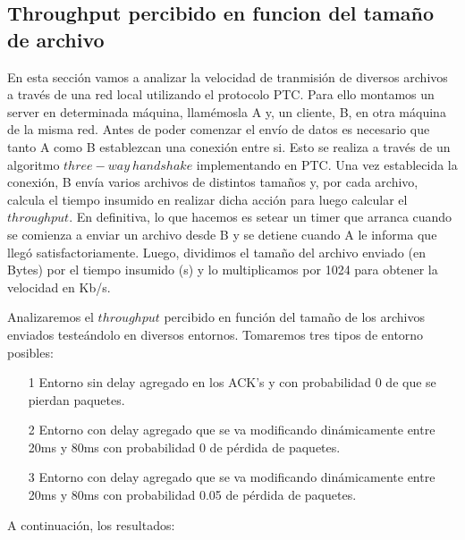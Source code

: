 \subsection{Throughput percibido en funcion del tamaño de archivo}

En esta sección vamos a analizar la velocidad de tranmisión de diversos archivos a través de una red local utilizando el protocolo PTC. Para ello montamos un server en determinada máquina, llamémosla A y, un cliente, B, en otra máquina de la misma red. Antes de poder comenzar el envío de datos es necesario que tanto A como B establezcan una conexión entre si. Esto se realiza a través de un algoritmo $three-way \ handshake$ implementando en PTC. Una vez establecida la conexión, B envía varios archivos de distintos tamaños y, por cada archivo, calcula el tiempo insumido en realizar dicha acción para luego calcular el $throughput$. En definitiva, lo que hacemos es setear un timer que arranca cuando se comienza a enviar un archivo desde B y se detiene cuando A le informa que llegó satisfactoriamente. Luego, dividimos el tamaño del archivo enviado (en Bytes) por el tiempo insumido (s) y lo multiplicamos por 1024 para obtener la velocidad en Kb/s.

Analizaremos el $throughput$ percibido en función del tamaño de los archivos enviados testeándolo en diversos entornos. Tomaremos tres tipos de entorno posibles:
\begin{itemize}
	\item[1] Entorno sin delay agregado en los ACK's y con probabilidad 0 de que se pierdan paquetes.
	\item[2] Entorno con delay agregado que se va modificando dinámicamente entre 20ms y 80ms con probabilidad 0 de pérdida de paquetes.
	\item[3] Entorno con delay agregado que se va modificando dinámicamente entre 20ms y 80ms con probabilidad 0.05 de pérdida de paquetes.
\end{itemize}

A continuación, los resultados:

